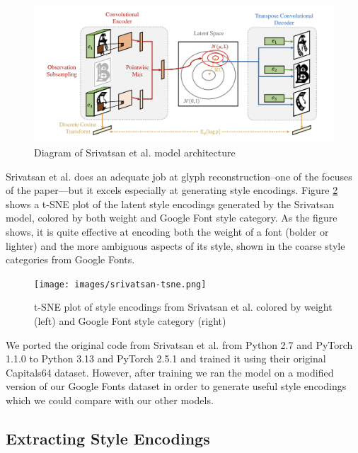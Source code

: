 \begin{figure}[h]
    \centering
    \includegraphics[width=\textwidth]{images/srivatsan-model.png}
    \caption{Diagram of Srivatsan et al. model architecture}
    \label{fig:srivatsan-model}
\end{figure}
 
Srivatsan et al. does an adequate job at glyph reconstruction–one of the focuses of the paper—but it excels especially at generating style encodings. Figure \ref{fig:srivatsan-tsne} shows a t-SNE plot of the latent style encodings generated by the Srivatsan model, colored by both weight and Google Font style category. As the figure shows, it is quite effective at encoding both the weight of a font (bolder or lighter) and the more ambiguous aspects of its style, shown in the coarse style categories from Google Fonts.

\begin{figure}[h]
    \centering
    \texttt{[image: images/srivatsan-tsne.png]}
    \caption{t-SNE plot of style encodings from Srivatsan et al. colored by weight (left) and Google Font style category (right)}
    \label{fig:srivatsan-tsne}
\end{figure}

We ported the original code from Srivatsan et al. from Python 2.7 and PyTorch 1.1.0 to Python 3.13 and PyTorch 2.5.1 and trained it using their original Capitals64 dataset. However, after training we ran the model on a modified version of our Google Fonts dataset in order to generate useful style encodings which we could compare with our other models.

\subsection{Extracting Style Encodings}

